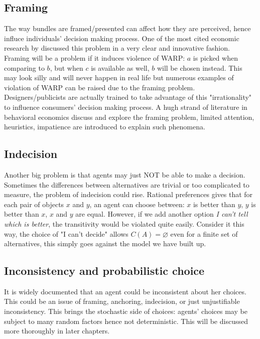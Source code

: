 \subsection{Framing}
The way bundles are framed/presented can affect how they are perceived, hence influce individuals' decision making process. One of the most cited economic research by \citet{kai1979prospect} discussed this problem in a very clear and
innovative fashion. Framing will be a problem if it induces violence of WARP: $a$ is picked when comparing to $b$, but when $c$ is available as well, $b$ will be chosen instead. This may look silly and will never happen in real life but 
numerous examples of violation of WARP can be raised due to the framing problem. Designers/publicists are actually trained to take advantage of this "irrationality" to influence consumers' decision making process. A hugh strand of literature
in behavioral economics discuss and explore the framing problem, limited attention, heuristics, impatience are introduced to explain such phenomena. 

\subsection{Indecision}
Another big problem is that agents may just NOT be able to make a decision. Sometimes the differences between alternatives are trivial or too complicated to measure, the problem of indecision could rise. Rational preferences gives that for each pair of objects $x$ and $y$, an agent can 
choose between: $x$ is better than $y$, $y$ is better than $x$, $x$ and $y$ are equal. However, if we add another option \textit{I can't tell which is better}, the transitivity would be violated quite easily. Consider it this way, the choice of "I can't decide" allows $C(A)=\varnothing$ even
for a finite set of alternatives, this simply goes against the model we have built up.

\subsection{Inconsistency and probabilistic choice}
It is widely documented that an agent could be inconsistent about her choices. This could be an issue of framing, anchoring, indecision, or just unjustifiable inconsistency. This brings the stochastic side of choices: agents' choices may be subject to many random factors
hence not deterministic. This will be discussed more thoroughly in later chapters.

